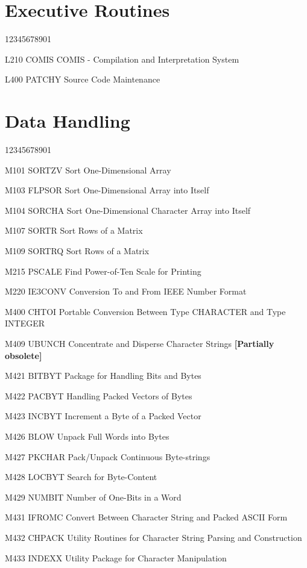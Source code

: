 \section*{Executive Routines}
\begin{DLtt}{12345678901}
\item[L210 COMIS] COMIS - Compilation and Interpretation System
\item[L400 PATCHY] Source Code Maintenance
\end{DLtt}
\section*{Data Handling}
\begin{DLtt}{12345678901}
\item[M101 SORTZV] Sort One-Dimensional Array
\item[M103 FLPSOR] Sort One-Dimensional Array into Itself
\item[M104 SORCHA] Sort One-Dimensional Character Array into Itself
\item[M107 SORTR] Sort Rows of a Matrix
\item[M109 SORTRQ] Sort Rows of a Matrix
\item[M215 PSCALE] Find Power-of-Ten Scale for Printing
\item[M220 IE3CONV] Conversion To and From IEEE Number Format
\item[M400 CHTOI] Portable Conversion Between Type CHARACTER
and Type INTEGER
\item[M409 UBUNCH] Concentrate and Disperse Character Strings
{\bf [Partially obsolete]}
\item[M421 BITBYT] Package for Handling Bits and Bytes
\item[M422 PACBYT] Handling Packed Vectors of Bytes
\item[M423 INCBYT] Increment a Byte of a Packed Vector
\item[M426 BLOW] Unpack Full Words into Bytes
\item[M427 PKCHAR] Pack/Unpack Continuous Byte-strings
\item[M428 LOCBYT] Search for Byte-Content
\item[M429 NUMBIT] Number of One-Bits in a Word
\item[M431 IFROMC] Convert Between Character String and Packed
ASCII Form
\item[M432 CHPACK] Utility Routines for Character String Parsing
and Construction
\item[M433 INDEXX] Utility Package for Character Manipulation

\end{DLtt}
